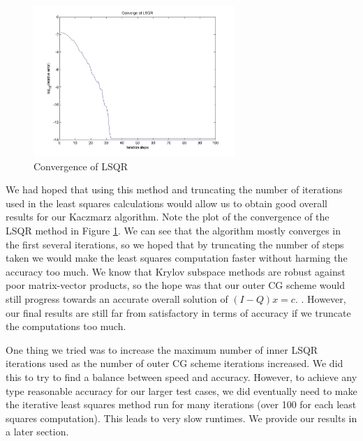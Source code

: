 \documentclass[a4paper,12pt]{article}
\begin{document}
    \begin{figure}[htbp]
    \begin{center}
            \includegraphics[width=3in]{Images/LSQR}
        \caption{Convergence of LSQR}
        \label{fig:LSQR}
        \end{center}
    \end{figure}
    
We had hoped that using this method and truncating the number of iterations used in the least squares calculations would allow us to obtain good overall results for our Kaczmarz algorithm. Note the plot of the convergence of the LSQR method in Figure \ref{fig:LSQR}. We can see that the algorithm mostly converges in the first several iterations, so we hoped that by truncating the number of steps taken we would make the least squares computation faster without harming the accuracy too much. We know that Krylov subspace methods are robust against poor matrix-vector products, so the hope was that our outer CG scheme would still progress towards an accurate overall solution of $(I-Q)x = c.$ . However, our final results are still far from satisfactory in terms of accuracy if we truncate the computations too much.

One thing we tried was to increase the maximum number of inner LSQR iterations used as the number of outer CG scheme iterations increased. We did this to try to find a balance between speed and accuracy. However, to achieve any type reasonable accuracy for our larger test cases, we did eventually need to make the iterative least squares method run for many iterations (over 100 for each least squares computation). This leads to very slow runtimes. We provide our results in a later section.

\end{document}

